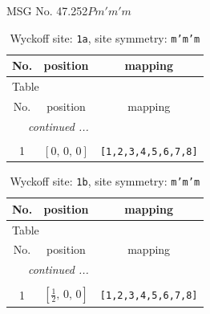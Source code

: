 \documentclass[fleqn,8pt]{jsarticle}
\begin{document}
\setcounter{MaxMatrixCols}{32}

\renewcommand{\tablename}{Table~}
\renewcommand{\figurename}{Figure~}
\begin{center}
\LARGE
MSG No. 47.252\quad$Pm'm'm$
\end{center}
\renewcommand{\arraystretch}{1.2}
\begin{longtable}{ccc}
\caption{Wyckoff site: {\tt 1a}, site symmetry: {\tt m'm'm}}
 \\
 \hline \hline
No. & position & mapping \\ \hline \endfirsthead

\multicolumn{2}{l}{\tablename\ \thetable{}} \\
 \hline \hline
No. & position & mapping \\ \hline \endhead

 \hline \hline
\multicolumn{2}{r}{\footnotesize\it continued ...} \\ \endfoot

 \hline \hline
\multicolumn{2}{r}{} \\ \endlastfoot

1 & $\left[ 0,\, 0,\, 0 \right]$ & {\tt [1,2,3,4,5,6,7,8]} \\
\end{longtable}
\renewcommand{\arraystretch}{1.2}
\begin{longtable}{ccc}
\caption{Wyckoff site: {\tt 1b}, site symmetry: {\tt m'm'm}}
 \\
 \hline \hline
No. & position & mapping \\ \hline \endfirsthead

\multicolumn{2}{l}{\tablename\ \thetable{}} \\
 \hline \hline
No. & position & mapping \\ \hline \endhead

 \hline \hline
\multicolumn{2}{r}{\footnotesize\it continued ...} \\ \endfoot

 \hline \hline
\multicolumn{2}{r}{} \\ \endlastfoot

1 & $\left[ \frac{1}{2},\, 0,\, 0 \right]$ & {\tt [1,2,3,4,5,6,7,8]} \\
\end{longtable}
\renewcommand{\arraystretch}{1.2}
\end{document}
